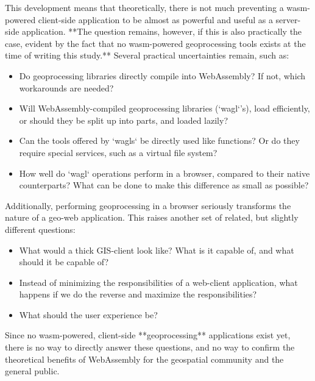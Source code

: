 This development means that theoretically, there is not much preventing a wasm-powered client-side application to be almost as powerful and useful as a server-side application. **The question remains, however, if this is also practically the case, evident by the fact that no wasm-powered geoprocessing tools exists at the time of writing this study.** Several practical uncertainties remain, such as: 
\begin{itemize}
  \item Do geoprocessing libraries directly compile into WebAssembly? If not, which workarounds are needed? 
  \item Will WebAssembly-compiled geoprocessing libraries (`wagl`'s), load efficiently, or should they be split up into parts, and loaded lazily? 
  \item Can the tools offered by `wagls` be directly used like functions? Or do they require special services, such as a virtual file system? 
  \item How well do `wagl` operations perform in a browser, compared to their native counterparts? What can be done to make this difference as small as possible?
\end{itemize}

Additionally, performing geoprocessing in a browser seriously transforms the nature of a geo-web application. This raises another set of related, but slightly different questions:

\begin{itemize}
  \item What would a thick GIS-client look like? What is it capable of, and what should it be capable of?
  \item Instead of minimizing the responsibilities of a web-client application, what happens if we do the reverse and maximize the responsibilities? 
  
  \item What should the user experience be?
\end{itemize}


Since no wasm-powered, client-side **geoprocessing** applications exist yet, there is no way to directly answer these questions, and no way to confirm the theoretical benefits of WebAssembly for the geospatial community and the general public.